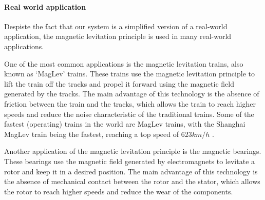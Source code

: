 \paragraph{Real world application}

Despiste the fact that our system is a simplified version of a real-world application, the magnetic levitation principle is used in many real-world applications.

One of the most common applications is the magnetic levitation trains, also known as `MagLev' trains.
These trains use the magnetic levitation principle to lift the train off the tracks and propel it forward using the magnetic field generated by the tracks.
The main advantage of this technology is the absence of friction between the train and the tracks, which allows the train to reach higher speeds and reduce the noise characteristic of the traditional trains.
Some of the fastest (operating) trains in the world are MagLev trains, with the Shanghai MagLev train being the fastest, reaching a top speed of $623 km/h$ \cite{WikiSCMaglev}.

Another application of the magnetic levitation principle is the magnetic bearings.
These bearings use the magnetic field generated by electromagnets to levitate a rotor and keep it in a desired position.
The main advantage of this technology is the absence of mechanical contact between the rotor and the stator, which allows the rotor to reach higher speeds and reduce the wear of the components.



